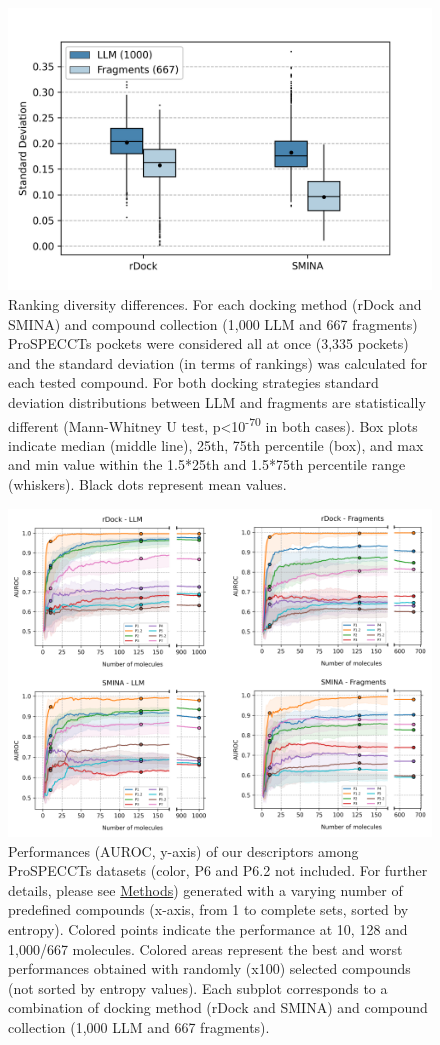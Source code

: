 \begin{figure}[htbp]
  \centering
  \includegraphics[width=0.55\linewidth]{figures/PocketVec/Supplementary/FigS6.png}
  \caption{
  Ranking diversity differences. For each docking method (rDock and SMINA) and compound collection (1,000 LLM and 667 fragments) ProSPECCTs pockets were considered all at once (3,335 pockets) and the standard deviation (in terms of rankings) was calculated for each tested compound. For both docking strategies standard deviation distributions between LLM and fragments are statistically different (Mann-Whitney U test, p<10\textsuperscript{-70} in both cases). Box plots indicate median (middle line), 25th, 75th percentile (box), and max and min value within the 1.5*25th and 1.5*75th percentile range (whiskers). Black dots represent mean values.
  }
  \label{PocketVec_FigS6}
\end{figure}


\begin{figure}[htbp]
  \centering
  \includegraphics[width=1\linewidth]{figures/PocketVec/Supplementary/FigS7.png}
  \caption{
  Performances (AUROC, y-axis) of our descriptors among ProSPECCTs datasets (color, P6 and P6.2 not included. For further details, please see \hyperref[PocketVec_Methods]{Methods}) generated with a varying number of predefined compounds (x-axis, from 1 to complete sets, sorted by entropy). Colored points indicate the performance at 10, 128 and 1,000/667 molecules. Colored areas represent the best and worst performances obtained with randomly (x100) selected compounds (not sorted by entropy values). Each subplot corresponds to a combination of docking method (rDock and SMINA) and compound collection (1,000 LLM and 667 fragments).   
  }
  \label{PocketVec_FigS7}
\end{figure}

